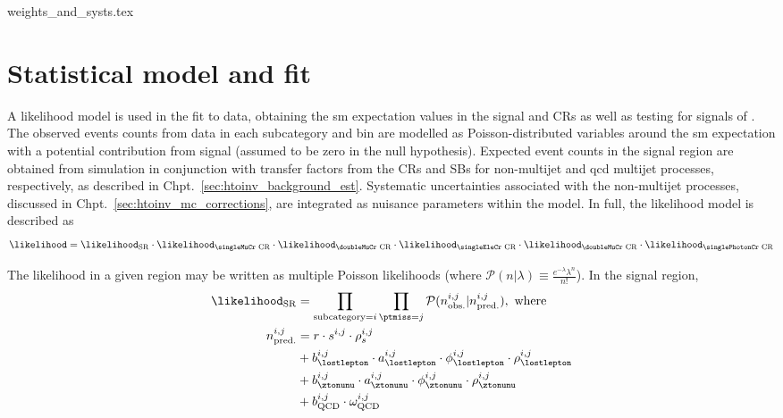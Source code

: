 

{weights_and_systs.tex}




\section{Statistical model and fit}
\label{sec:htoinv_satistical_treatment}

A likelihood model is used in the fit to data, obtaining the \acrlong{sm} expectation values in the signal and \glspl{CR} as well as testing for signals of \higgstoinv. The observed events counts from data in each subcategory and \ptmiss bin are modelled as Poisson-distributed variables around the \acrshort{sm} expectation with a potential contribution from signal (assumed to be zero in the null hypothesis). Expected event counts in the signal region are obtained from simulation in conjunction with transfer factors from the \glspl{CR} and \glspl{SB} for non-multijet and \acrshort{qcd} multijet processes, respectively, as described in Chpt.~\ref{sec:htoinv_background_est}. Systematic uncertainties associated with the non-multijet processes, discussed in Chpt.~\ref{sec:htoinv_mc_corrections}, are integrated as nuisance parameters within the model. In full, the likelihood model is described as
\begin{equation}
    \likelihood = \likelihood_{\mathrm{SR}} \cdot \likelihood_{\text{\singleMuCr CR}} \cdot \likelihood_{\text{\doubleMuCr CR}} \cdot \likelihood_{\text{\singleEleCr CR}} \cdot \likelihood_{\text{\doubleMuCr CR}} \cdot \likelihood_{\text{\singlePhotonCr CR}}
    \label{eq:likelihood_overall}
\end{equation}

The likelihood in a given region may be written as multiple Poisson likelihoods (where $\mathcal{P}(n | \lambda) \equiv \frac{ e^{-\lambda} \lambda^n }{n!}$). In the signal region,
\begin{equation}
    \begin{aligned}
\likelihood_{\mathrm{SR}} &= \prod_{\mathrm{subcategory} = i} \prod_{\ptmiss = j} \mathcal{P}(n_{\mathrm{obs.}}^{i, j} | n_{\mathrm{pred.}}^{i, j}), \ \text{where}\\
n_{\mathrm{pred.}}^{i, j} &= r \cdot s^{i, j} \cdot \rho_s^{i, j}\\
&+ b_{\lostlepton}^{i, j} \cdot a_{\lostlepton}^{i, j} \cdot \phi_{\lostlepton}^{i, j} \cdot \rho_{\lostlepton}^{i, j}\\
&+ b_{\ztonunu}^{i, j} \cdot a_{\ztonunu}^{i, j} \cdot \phi_{\ztonunu}^{i, j} \cdot \rho_{\ztonunu}^{i, j}\\
&+ b_{\mathrm{QCD}}^{i, j} \cdot \omega_{\mathrm{QCD}}^{i, j}
    \end{aligned}
    \label{eq:likelihood_SR}
\end{equation}


